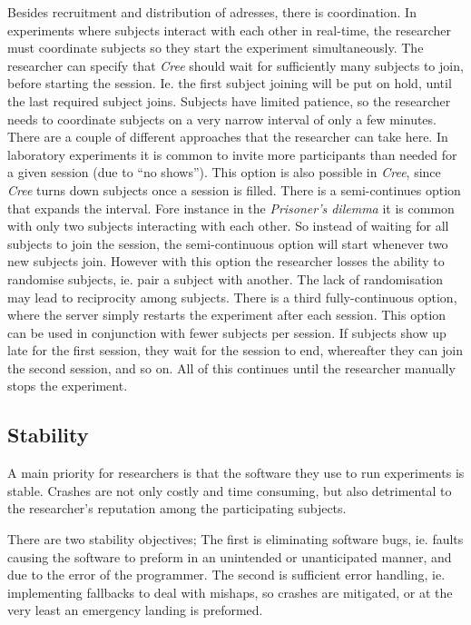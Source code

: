 \documentclass[preprint, 12pt]{elsarticle}
\newcommand{\Cree}{\emph{Cree}\xspace}
\begin{document}
Besides recruitment and distribution of adresses, there is coordination. In experiments where subjects interact with each other in real-time, the researcher must coordinate subjects so they start the experiment simultaneously. The researcher can specify that \Cree should wait for sufficiently many subjects to join, before starting the session. Ie. the first subject joining will be put on hold, until the last required subject joins. Subjects have limited patience, so the researcher needs to coordinate subjects on a very narrow interval of only a few minutes. There are a couple of different approaches that the researcher can take here. In laboratory experiments it is common to invite more participants than needed for a given session (due to ``no shows''). This option is also possible in \Cree, since \Cree turns down subjects once a session is filled. There is a semi-continues option that expands the interval. Fore instance in the \emph{Prisoner's dilemma} it is common with only two subjects interacting with each other. So instead of waiting for all subjects to join the session, the semi-continuous option will start whenever two new subjects join. However with this option the researcher losses the ability to randomise subjects, ie. pair a subject with another. The lack of randomisation may lead to reciprocity among subjects. There is a third fully-continuous option, where the server simply restarts the experiment after each session. This option can be used in conjunction with fewer subjects per session. If subjects show up late for the first session, they wait for the session to end, whereafter they can join the second session, and so on. All of this continues until the researcher manually stops the experiment.

\subsection{Stability}

A main priority for researchers is that the software they use to run experiments is stable. Crashes are not only costly and time consuming, but also detrimental to the researcher's reputation among the participating subjects. 

There are two stability objectives; The first is eliminating software bugs, ie. faults causing the software to preform in an unintended or unanticipated manner, and due to the error of the programmer. The second is sufficient error handling, ie. implementing fallbacks to deal with mishaps, so crashes are mitigated, or at the very least an emergency landing is preformed.
\end{document}
